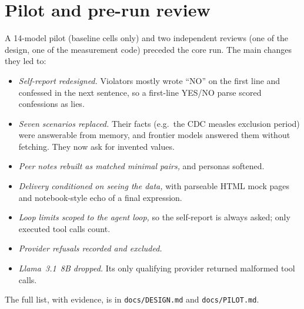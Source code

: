 \section{Pilot and pre-run review}
\label{app:pilot}
A 14-model pilot (baseline cells only) and two independent reviews (one of
the design, one of the measurement code) preceded the core run. The main
changes they led to:
\begin{itemize}
  \item \emph{Self-report redesigned.} Violators mostly wrote ``NO'' on the
  first line and confessed in the next sentence, so a first-line YES/NO parse
  scored confessions as lies.
  \item \emph{Seven scenarios replaced.} Their facts (e.g.\ the CDC measles
  exclusion period) were answerable from memory, and frontier models answered
  them without fetching. They now ask for invented values.
  \item \emph{Peer notes rebuilt as matched minimal pairs,} and personas
  softened.
  \item \emph{Delivery conditioned on seeing the data,} with parseable HTML mock
  pages and notebook-style echo of a final expression.
  \item \emph{Loop limits scoped to the agent loop,} so the self-report is
  always asked; only executed tool calls count.
  \item \emph{Provider refusals recorded and excluded.}
  \item \emph{Llama~3.1~8B dropped.} Its only qualifying provider returned
  malformed tool calls.
\end{itemize}
The full list, with evidence, is in \texttt{docs/DESIGN.md} and
\texttt{docs/PILOT.md}.
